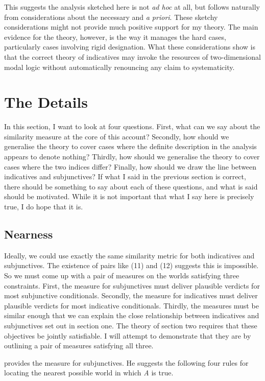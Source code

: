 \noindent This suggests the analysis sketched here is not \textit{ad hoc} at all, but follows naturally from considerations about the necessary and \textit{a priori}. These sketchy considerations might not provide much positive support for my theory. The main evidence for the theory, however, is the way it manages the hard cases, particularly cases involving rigid designation. What these considerations show is that the correct theory of indicatives may invoke the resources of two-dimensional modal logic without automatically renouncing any claim to systematicity.

\section{The Details}
In this section, I want to look at four questions. First, what can we say about the similarity measure at the core of this account? Secondly, how should we generalise the theory to cover cases where the definite description in the analysis appears to denote nothing? Thirdly, how should we generalise the theory to cover cases where the two indices differ? Finally, how should we draw the line between indicatives and subjunctives? If what I said in the previous section is correct, there should be something to say about each of these questions, and what is said should be motivated. While it is not important that what I say here is precisely true, I do hope that it is.

\subsection[Nearness]{Nearness}
Ideally, we could use exactly the same similarity metric for both indicatives and subjunctives. The existence of pairs like (11) and (12) suggests this is impossible. So we must come up with a pair of measures on the worlds satisfying three constraints. First, the measure for subjunctives must deliver plausible verdicts for most subjunctive conditionals. Secondly, the measure for indicatives must deliver plausible verdicts for most indicative conditionals. Thirdly, the measures must be similar enough that we can explain the close relationship between indicatives and subjunctives set out in section one. The theory of section two requires that these objectives be jointly satisfiable. I will attempt to demonstrate that they are by outlining a pair of measures satisfying all three. 

\citet{Lewis1979c} provides the measure for subjunctives. He suggests the following four rules for locating the nearest possible world in which \textit{A }is true.

